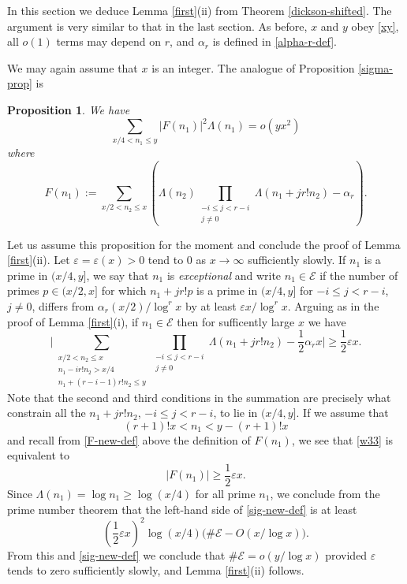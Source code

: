 \documentclass[12pt]{amsart}
\numberwithin{equation}{section}  %
\theoremstyle{remark}
\theoremstyle{plain}
\newtheorem{prop}{Proposition}
\numberwithin{equation}{section}
\newcommand{\eps}{\ensuremath{\varepsilon}}
\renewcommand{\le}{\leqslant}
\renewcommand{\leq}{\leqslant}
\renewcommand{\ge}{\geqslant}
\renewcommand{\geq}{\geqslant}
\renewcommand{\(}{\left(}
\renewcommand{\)}{\right)}
\begin{document}
In this section we deduce Lemma \ref{first}(ii) from Theorem \ref{dickson-shifted}. The argument is very similar to that in the last section.  As before, $x$ and $y$ obey \eqref{xy}, all $o(1)$ terms may depend on $r$, and $\alpha_r$ is defined in \eqref{alpha-r-def}.

We may again assume that $x$ is an integer.  The analogue of Proposition \ref{sigma-prop} is


\begin{prop}\label{sigma-prop-2}  We have
\begin{equation}\label{sig-new-def} 
\sum_{x/4 < n_1 \le y} |F(n_1)|^2 \Lambda(n_1) = o(y x^2 )
\end{equation}
where
\begin{equation}\label{F-new-def} F(n_1) := \sum_{x/2<n_2\le x} \left(\Lambda(n_2) \prod_{\substack{-i \leq j < r - i \\ j \neq 0}}\Lambda(n_1 + j r! n_2)  - \alpha_r\right).\end{equation}
\end{prop}


Let us assume this proposition for the moment and conclude the proof of Lemma \ref{first}(ii).
Let $\eps = \eps(x) > 0$ tend to 0 as $x\to\infty$ sufficiently
slowly. 
If $n_1$ is a prime in $(x/4,y]$, we say that $n_1$ is
  \emph{exceptional} and write $n_1 \in \mathscr{E}$ if the number of
  primes $p \in (x/2,x]$ for which $n_1 + j r! p$ is a prime in
    $(x/4,y]$ for $-i \leq j < r - i$, $j \neq 0$, differs from
      $\alpha_r (x/2)/\log^r x$ by at least $\eps x/\log^r x$. 
Arguing as in the proof of Lemma \ref{first}(i), if $n_1
      \in \mathscr{E}$ then for sufficently large $x$ we have
\begin{equation}\label{w33} \Bigg| \sum_{\substack{x/2<n_2\le x \\ n_1 - ir! n_2 > x/4 \\ n_1 + (r - i - 1)r! n_2 \leq y}} \prod_{\substack{-i \leq j < r-i \\ j \neq 0}} \Lambda(n_1 + jr! n_2) - \frac{1}{2}\alpha_r x\bigg| \geq \frac{1}{2}\eps x.\end{equation}
Note that the second and third conditions in the summation are
precisely what constrain all the $n_1 + jr! n_2$, $-i \leq j < r-i$,
to lie in $(x/4,y]$.  If we assume that
\[
(r+1)! x < n_1 < y - (r+1)! x
\]
and recall from \eqref{F-new-def} above the definition of $F(n_1)$,
we see that \eqref{w33} is equivalent to 
\[ |F(n_1)| \geq \frac{1}{2}\eps x.\]
Since $\Lambda(n_1) = \log n_1 \ge \log (x/4)$ for all prime $n_1$, we conclude from
the prime number theorem that the left-hand side of \eqref{sig-new-def} is at least
\[
 \left( \frac12 \eps x \right)^2 \log(x/4) \big( \# \mathscr{E} - O(x/\log x) \big).
\]
From this and \eqref{sig-new-def} we conclude that  $\# \mathscr{E}=o(y/\log
x)$  provided $\eps$ tends to zero sufficiently slowly, and Lemma \ref{first}(ii) follows.
\end{document}
